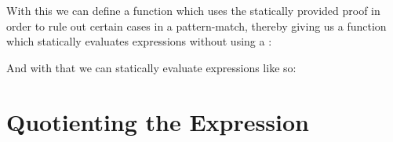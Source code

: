 With this we can define a function which uses the statically provided proof in
order to rule out certain cases in a pattern-match, thereby giving us a function
which statically evaluates expressions without using a :
\begin{agdalisting}
\end{agdalisting}

And with that we can statically evaluate expressions like so:
\begin{agdalisting}
\end{agdalisting}


\section{Quotienting the Expression}

